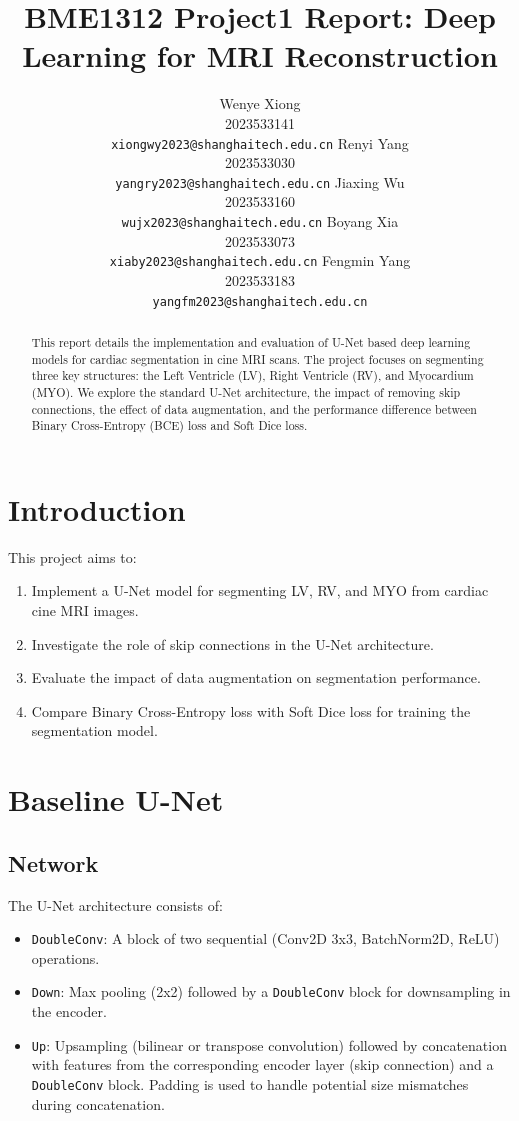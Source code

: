 \documentclass{article}
\title{BME1312 Project1 Report: Deep Learning for MRI Reconstruction}
\author{%
  Wenye Xiong \\
  2023533141 \\
  \texttt{xiongwy2023@shanghaitech.edu.cn}
  \And
  Renyi Yang \\
  2023533030 \\
  \texttt{yangry2023@shanghaitech.edu.cn}
  \AND
  Jiaxing Wu \\
  2023533160 \\
  \texttt{wujx2023@shanghaitech.edu.cn}
  \And
  Boyang Xia \\
  2023533073 \\
  \texttt{xiaby2023@shanghaitech.edu.cn}
  \AND
  Fengmin Yang \\
  2023533183 \\
  \texttt{yangfm2023@shanghaitech.edu.cn}
}
\begin{document}
\maketitle


\begin{abstract}
This report details the implementation and evaluation of U-Net based deep learning models for cardiac segmentation 
in cine MRI scans. The project focuses on segmenting three key structures: the Left Ventricle (LV), Right Ventricle (RV), 
and Myocardium (MYO). We explore the standard U-Net architecture, the impact of removing skip connections, the effect of 
data augmentation, and the performance difference between Binary Cross-Entropy (BCE) loss and Soft Dice loss.
\end{abstract}

\section{Introduction}
This project aims to:
\begin{enumerate}
    \item Implement a U-Net model for segmenting LV, RV, and MYO from cardiac cine MRI images.
    \item Investigate the role of skip connections in the U-Net architecture.
    \item Evaluate the impact of data augmentation on segmentation performance.
    \item Compare Binary Cross-Entropy loss with Soft Dice loss for training the segmentation model.
\end{enumerate}



\section{Baseline U-Net}

\subsection{Network}
The U-Net architecture consists of:
\begin{itemize}
    \item \texttt{DoubleConv}: A block of two sequential (Conv2D 3x3, BatchNorm2D, ReLU) operations.
    \item \texttt{Down}: Max pooling (2x2) followed by a \texttt{DoubleConv} block for downsampling in the encoder.
    \item \texttt{Up}: Upsampling (bilinear or transpose convolution) followed by concatenation with features from the 
    corresponding encoder layer (skip connection) and a \texttt{DoubleConv} block. Padding is used to handle potential 
    size mismatches during concatenation.
\end{itemize}
\end{document}
